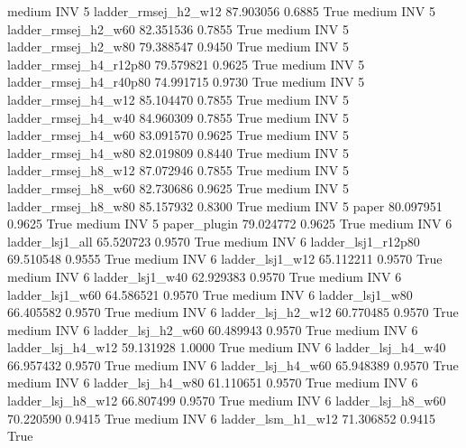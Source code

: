     medium      INV                 5    ladder_rmsej_h2_w12  87.903056      0.6885    True
    medium      INV                 5    ladder_rmsej_h2_w60  82.351536      0.7855    True
    medium      INV                 5    ladder_rmsej_h2_w80  79.388547      0.9450    True
    medium      INV                 5 ladder_rmsej_h4_r12p80  79.579821      0.9625    True
    medium      INV                 5 ladder_rmsej_h4_r40p80  74.991715      0.9730    True
    medium      INV                 5    ladder_rmsej_h4_w12  85.104470      0.7855    True
    medium      INV                 5    ladder_rmsej_h4_w40  84.960309      0.7855    True
    medium      INV                 5    ladder_rmsej_h4_w60  83.091570      0.9625    True
    medium      INV                 5    ladder_rmsej_h4_w80  82.019809      0.8440    True
    medium      INV                 5    ladder_rmsej_h8_w12  87.072946      0.7855    True
    medium      INV                 5    ladder_rmsej_h8_w60  82.730686      0.9625    True
    medium      INV                 5    ladder_rmsej_h8_w80  85.157932      0.8300    True
    medium      INV                 5                  paper  80.097951      0.9625    True
    medium      INV                 5           paper_plugin  79.024772      0.9625    True
    medium      INV                 6        ladder_lsj1_all  65.520723      0.9570    True
    medium      INV                 6     ladder_lsj1_r12p80  69.510548      0.9555    True
    medium      INV                 6        ladder_lsj1_w12  65.112211      0.9570    True
    medium      INV                 6        ladder_lsj1_w40  62.929383      0.9570    True
    medium      INV                 6        ladder_lsj1_w60  64.586521      0.9570    True
    medium      INV                 6        ladder_lsj1_w80  66.405582      0.9570    True
    medium      INV                 6      ladder_lsj_h2_w12  60.770485      0.9570    True
    medium      INV                 6      ladder_lsj_h2_w60  60.489943      0.9570    True
    medium      INV                 6      ladder_lsj_h4_w12  59.131928      1.0000    True
    medium      INV                 6      ladder_lsj_h4_w40  66.957432      0.9570    True
    medium      INV                 6      ladder_lsj_h4_w60  65.948389      0.9570    True
    medium      INV                 6      ladder_lsj_h4_w80  61.110651      0.9570    True
    medium      INV                 6      ladder_lsj_h8_w12  66.807499      0.9570    True
    medium      INV                 6      ladder_lsj_h8_w60  70.220590      0.9415    True
    medium      INV                 6      ladder_lsm_h1_w12  71.306852      0.9415    True
